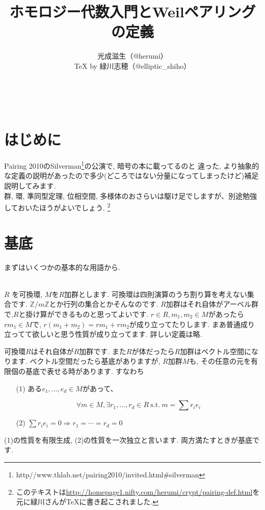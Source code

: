 \documentclass{jsarticle}
\title{ホモロジー代数入門とWeilペアリングの定義}
\author{光成滋生（@herumi）\\{\TeX} by 緑川志穂（@elliptic\_shiho）}
\date{}
\theoremstyle{definition}
\numberwithin{theorem}{section}
\begin{document}
\maketitle

\tableofcontents

\hrulefill\\

\section*{はじめに}
Pairing 2010のSilverman\footnote{http\://www.thlab.net/pairing2010/invited.html\#silverman}の公演で, 暗号の本に載ってるのと
違った, より抽象的な定義の説明があったので多少(どころではない分量になってしまったけど)補足説明してみます.\\
群, 環, 準同型定理, 位相空間, 多様体のおさらいは駆け足でしますが、別途勉強しておいたほうがよいでしょう.
\footnote{このテキストは\url{http://homepage1.nifty.com/herumi/crypt/pairing-def.html}を元に緑川さんがTeXに書き起こされました.}
\newpage

\section{基底}
まずはいくつかの基本的な用語から.

\hrulefill\\

$R$ を可換環, $M$を$R$加群とします. 可換環は四則演算のうち割り算を考えない集合です. $\mathbb{Z}/m\mathbb{Z}$とか行列の集合とかそんなのです. 
$R$加群はそれ自体がアーベル群で,$R$と掛け算ができるものと思ってよいです. $r \in R, m_1, m_2 \in M$があったら$rm_1\in M$で, 
$r(m_1+m_2) = rm_1+rm_2$が成り立ってたりします. まあ普通成り立ってて欲しいと思う性質が成り立ってます. 詳しい定義は略.

可換環$R$はそれ自体が$R$加群です. また$R$が体だったら$R$加群はベクトル空間になります. ベクトル空間だったら基底がありますが, $R$加群$M$も, 
その任意の元を有限個の基底で表せる時があります. すなわち
\begin{itemize}
\item[(1)] ある$e_1, \ldots, e_d\in M$があって、

$$
\forall m\in M, \exists r_1, \ldots, r_d \in R\ \mathrm{s.t.}\ m = \sum r_i e_i
$$
\item[(2)] $\sum r_i e_i = 0 \Rightarrow r_1=\cdots=r_d=0$
\end{itemize}

(1)の性質を有限生成, (2)の性質を一次独立と言います. 両方満たすときが基底です.
\end{document}
